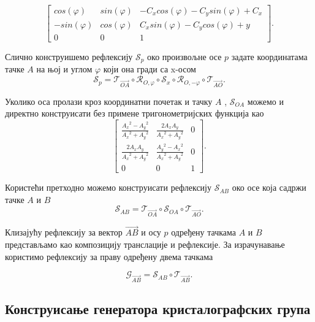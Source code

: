 \documentclass[12pt]{article}
\begin{document}
\[\begin{bmatrix}cos(\varphi) & sin(\varphi) & -C_x cos(\varphi) - C_y sin(\varphi) + C_x\\ -sin(\varphi) & cos(\varphi)&C_x sin(\varphi) - C_y cos(\varphi) +y\\ 0 & 0 & 1\end{bmatrix}.\]

Слично конструишемо рефлексију $\mathcal{S}_p$ око произвољне осе $p$ задате координатама тачке $A$ на њој и углом $\varphi$ који она гради са x-осом
$$\mathcal{S}_{p} = \mathcal{T}_{\vec{OA}} \circ \mathcal{R}_{O,\varphi} \circ \mathcal{S}_{x} \circ \mathcal{R}_{O,-\varphi} \circ \mathcal{T}_{\vec{AO}}.$$

Уколико оса пролази кроз координатни почетак и тачку $A$ , $\mathcal{S}_{OA}$ можемо и директно конструисати без примене тригонометријских функција као
\[\begin{bmatrix} \frac{{A_x}^2-{A_y}^2}{{A_x}^2+{A_y}^2} & \frac{2A_x A_y}{{A_x}^2+{A_y}^2} & 0\\ \frac{2A_x A_y}{{A_x}^2+{A_y}^2} & \frac{{A_y}^2-{A_x}^2}{{A_x}^2+{A_y}^2}&0 \\ 0 & 0 & 1\end{bmatrix}.\]

Користећи претходно можемо конструисати рефлексију $\mathcal{S}_{AB}$ око осе која садржи тачке $A$ и $B$
$$ \mathcal{S}_{AB}   = \mathcal{T}_{\vec{OA}} \circ \mathcal{S}_{OA} \circ \mathcal{T}_{\vec{AO}} . $$

Клизајућу рефлексију за вектор $\vec{AB}$ и осу $p$ одређену тачкама $A$ и $B$ представљамо као композицију транслације и рефлексије. За израчунавање користимо рефлексију за праву одређену двема тачкама

$$ \mathcal{G}_{\vec{AB}} = \mathcal{S}_{AB} \circ \mathcal{T}_{\vec{AB}}.$$


\subsection{Конструисање генератора кристалографских група}



\end{document}
